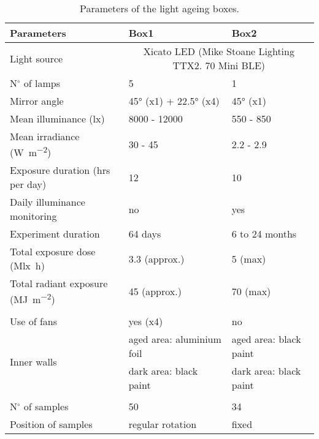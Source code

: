 \begin{table*}
\caption[\hspace{0.3cm}Parameters of the light ageing boxes]{Parameters of the light ageing boxes.}
\begin{tabular}{p{5cm}p{4cm}p{4cm}}
\toprule[0.5mm]
\textbf{Parameters} & \textbf{Box1} & \textbf{Box2} \\\midrule
Light source &  \multicolumn{2}{c}{Xicato LED (Mike Stoane Lighting TTX2. 70 Mini BLE)} \\
N$^\circ$ of lamps & 5 & 1 \\
Mirror angle & \ang{45} (x1) + \ang{22.5} (x4) & \ang{45} (x1) \\
Mean illuminance (\unit{\lux}) & 8000 - 12000 & 550 - 850 \\
Mean irradiance (\unit{\watt\per\square\metre}) & 30 - 45 & 2.2 - 2.9 \\
Exposure duration (hrs per day) & 12 & 10 \\
Daily illuminance monitoring & no & yes \\
Experiment duration & 64 days & 6 to 24 months \\
Total exposure dose (\unit{\mega\lux\hour}) & 3.3 (approx.) & 5 (max) \\
Total radiant exposure (\unit{\mega\joule\per\square\metre}) & 45 (approx.) & 70 (max) \\
& & \\
Use of fans & yes (x4) & no \\
\multirow{2}{*}{Inner walls} & aged area: aluminium foil & aged area: black paint  \\
& dark area: black paint & dark area: black paint\\
& & \\
N$^\circ$ of samples & 50 & 34 \\
Position of samples & regular rotation & fixed \\
\bottomrule[0.5mm]
\end{tabular}
\label{tab:LB_info_boxes}
\end{table*}





